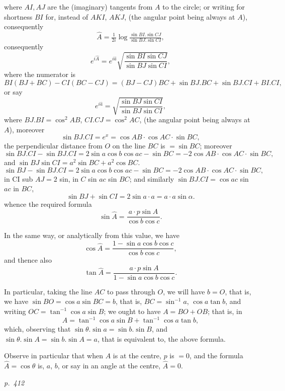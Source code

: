 \documentclass[11pt,a4paper]{book}
\begin{document}
\noindent
where $A I, A J$ are the (imaginary) tangents from $A$ to the circle; or writing for
shortness $B I$ for, instead of $A K I$, $A K J$, (the angular point being always at $A$),
consequently
\[
\hat{A} = \tfrac{1}{2 i} \log \tfrac{\sin BI. \sin CJ}{\sin BJ. \sin CI},
\]
consequently
\[
e^{i \hat{A}} = e^{i \hat{a}} \sqrt{\frac{\sin BI \sin CJ}{\sin BJ \sin CI}},
\]
where the numerator is
\[
B I (BJ + B C) - C I (BC - C J) = (BJ - C J) B C + \sin BJ.BC + \sin BJ.CI + B I.CI,
\]
or say
\[
e^{i \hat{a}} = \sqrt{\frac{\sin BJ \sin CI}{\sin BJ \sin CI}},
\]
where $B J. B I = \cos^2 A B$, $C I. C J = \cos^2 A C$, (the angular point being always at $A$), moreover
\[
\sin BJ.CI = e^x = \cos AB \cdot \cos AC \cdot \sin BC,
\]
the perpendicular distance from $O$ on the line $BC$ is $= \sin BC$; moreover
\[
\sin BJ.CI - \sin BJ.CI = 2 \sin a \cos b \cos a c - \sin BC = - 2 \cos AB \cdot \cos AC \cdot \sin BC,
\]
and $\sin BJ \sin CI = a^2 \sin BC + a^2 \cos BC$.
\[
\sin BJ - \sin BJ.CI = 2 \sin a \cos b \cos a c - \sin BC = - 2 \cos AB \cdot \cos AC \cdot \sin BC,
\]
in CI sub $AJ = 2$ sin, in $C$ sin $a c$ sin $BC$; and similarly $\sin BJ.CI = \cos a c$ sin $a c$ in $BC$,
\[
\sin BJ + \sin CI = 2 \sin a \cdot a = a \cdot a \sin \alpha.
\]
whence the required formula
\[
\sin \hat{A} = \frac{a \cdot p \sin A}{\cos b \cos c}.
\]

In the same way, or analytically from this value, we have
\[
\cos \hat{A} = \frac{1 - \sin a \cos b \cos c}{\cos b \cos c},
\]
and thence also
\[
\tan \hat{A} = \frac{a \cdot p \sin A}{1 - \sin a \cos b \cos c}.
\]

In particular, taking the line $A C$ to pass through $O$, we will have $b = O$, that is, we have $\sin B O = \cos a \sin BC = b$, that is, $B C = \sin^{-1} a$, $\cos a \tan b$, and writing
$O C = \tan^{-1} \cos a \sin B$; we ought to have $A = B O + O B$; that is, in
\[
A = \tan^{-1}\cos a \sin B + \tan^{-1} \cos a \tan b,
\]
which, observing that $\sin\theta. \sin a = \sin b. \sin B$, and $\sin \theta. \sin A = \sin b. \sin A = a$, that is
equivalent to, the above formula.

Observe in particular that when $A$ is at the centre, $p$ is $= 0$, and the formula
$\hat{A} = \cos \theta$ is, $a$, $b$, or say in an angle at the centre, $\hat{A} = 0$.

\clearpage

\bigskip
\textit{p.~412}
\smallskip
\end{document}
